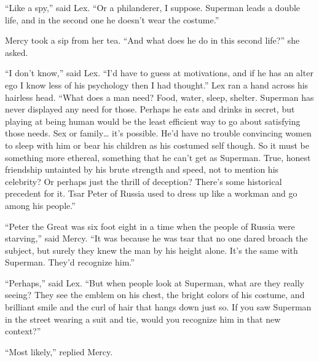 ``Like a spy,'' said Lex. ``Or a philanderer, I suppose. Superman leads
a double life, and in the second one he doesn't wear the costume.''

Mercy took a sip from her tea. ``And what does he do in this second
life?'' she asked.

``I don't know,'' said Lex. ``I'd have to guess at motivations, and if
he has an alter ego I know less of his psychology then I had thought.''
Lex ran a hand across his hairless head. ``What does a man need? Food,
water, sleep, shelter. Superman has never displayed any need for those.
Perhaps he eats and drinks in secret, but playing at being human would
be the least efficient way to go about satisfying those needs. Sex or
family\ldots{} it's possible. He'd have no trouble convincing women to
sleep with him or bear his children as his costumed self though. So it
must be something more ethereal, something that he can't get as
Superman. True, honest friendship untainted by his brute strength and
speed, not to mention his celebrity? Or perhaps just the thrill of
deception? There's some historical precedent for it. Tsar Peter of
Russia used to dress up like a workman and go among his people.''

``Peter the Great was six foot eight in a time when the people of Russia
were starving,'' said Mercy. ``It was because he was tsar that no one
dared broach the subject, but surely they knew the man by his height
alone. It's the same with Superman. They'd recognize him.''

``Perhaps,'' said Lex. ``But when people look at Superman, what are they
really seeing? They see the emblem on his chest, the bright colors of
his costume, and brilliant smile and the curl of hair that hangs down
just so. If you saw Superman in the street wearing a suit and tie, would
you recognize him in that new context?''

``Most likely,'' replied Mercy.

